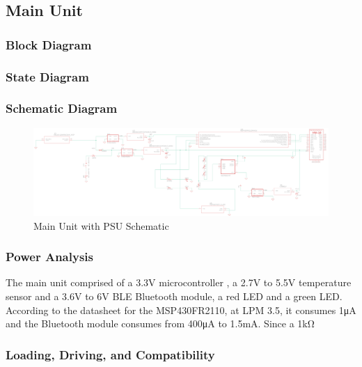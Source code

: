 \subsection{Main Unit}
\subsubsection{Block Diagram}
\subsubsection{State Diagram}

\subsubsection{Schematic Diagram}
\begin{landscape}
  \begin{center}
  \begin{figure}[H]
    \includegraphics[width=\pdfpagewidth,height=0.65\textheight]{../Modular Design/Main-Unit/Figures/main-unit-and-psu.png}
    \caption{Main Unit with PSU Schematic}
    \label{fig:main-with-psu-schematic}
  \end{figure}
  \end{center}
  \end{landscape}
\subsubsection{Power Analysis}
The main unit comprised of a 3.3\si{\V} microcontroller \cite{MSP430FR2110DataSheet}, a 2.7\si{\V} to 5.5\si{\V} temperature sensor \cite{TMP36GT9Z} and a 3.6\si{\V} to 6\si{\V} BLE Bluetooth module, a red LED and a green LED. According to the datasheet for the MSP430FR2110, at LPM 3.5, it consumes 1\si{\micro\ampere} and the Bluetooth module consumes from 400\si{\micro\ampere} to 1.5\si{\milli\ampere}. Since a 1\si{\kilo\ohm}
\subsubsection{Loading, Driving, and Compatibility}
